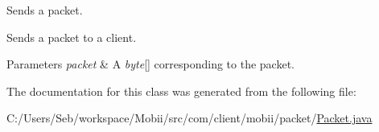Sends a packet. 

Sends a packet to a client. 
\begin{DoxyParams}{Parameters}
{\em packet} & A {\itshape byte}\mbox{[}\mbox{]} corresponding to the packet. \\
\hline
\end{DoxyParams}


The documentation for this class was generated from the following file\-:\begin{DoxyCompactItemize}
\item 
C\-:/\-Users/\-Seb/workspace/\-Mobii/src/com/client/mobii/packet/\hyperlink{_packet_8java}{Packet.\-java}\end{DoxyCompactItemize}
